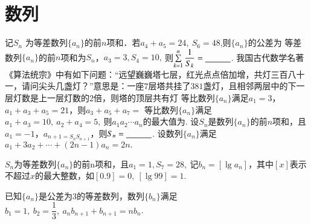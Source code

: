 \documentclass{BHCexam}
\begin{document}
\section{数列}
\begin{questions}
	\qs 记$S_n$ 为等差数列$\{a_n\}$的前$n$项和．若$ a_4+a_5=24,~S_6=48 $,则$\{a_n\}$的公差为\xx
	\qs 等差数列$\{a_n\}$的前$ n $项和为$ S_n $，$ a_3=3,S_4=10, ~$则$ \sum\limits_{k=1}^{n}\dfrac{1}{S_k} =\underline{\hspace{3em}}$. 
	\qs 我国古代数学名著《算法统宗》中有如下问题：“远望巍巍塔七层，红光点点倍加增，共灯三百八十一，请问尖头几盏灯？”意思是：一座$7$层塔共挂了$381$盏灯，且相邻两层中的下一层灯数是上一层灯数的$2$倍，则塔的顶层共有灯\xx
	\qs 等比数列$\{a_n\}$满足$a_1=3$，$a_1+a_3+a_5=21$，则$ a_3+a_5+a_7= $\xx
	\qs 等比数列$\{a_n\}$满足$ a_1+a_3=10,~a_2+a_4=5,~ $则$ a_1a_2\cdots a_n $的最大值为\tk.
	\qs 设$S_n$是数列$\{a_n\}$的前$n$项和，且$a_1=-1$，$ a_{n+1=S_nS_{n+1}} $，则$ S_n=\underline{\hspace{3em}} $.
	\qs 设数列$\{a_n\}$满足$ a_1+3a_2+\cdots+\left(2n-1\right) a_n=2n.$
	\qs $S_n$为等差数列$\{a_n\}$的前n项和，且$ a_1=1,S_7=28,~ $记$ b_n=\left[\lg {a_n}\right] $，其中$ \left[x\right] $表示不超过$ x $的最大整数，如$ \left[0.9\right] =0,~\left[\lg {99}\right]=1.$
	\qs 已知$\{a_n\}$是公差为$ 3 $的等差数列，数列$ \{b_n\} $满足$ b_1=1,~b_2=\dfrac{1}{3} ,~a_nb_{n+1}+b_{n+1}=nb_n$.
\end{questions}
\end{document}
